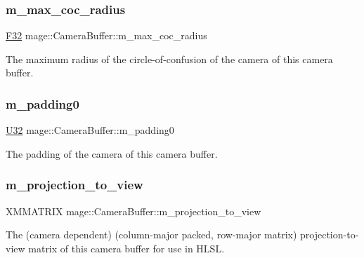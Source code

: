 \subsubsection{\texorpdfstring{m\+\_\+max\+\_\+coc\+\_\+radius}{m\_max\_coc\_radius}}
{\footnotesize\ttfamily \hyperlink{namespacemage_aa97e833b45f06d60a0a9c4fc22ae02c0}{F32} mage\+::\+Camera\+Buffer\+::m\+\_\+max\+\_\+coc\+\_\+radius}

The maximum radius of the circle-\/of-\/confusion of the camera of this camera buffer. \hypertarget{structmage_1_1_camera_buffer_a56019b41362cd7ddb5d747ed4705d854}{}\label{structmage_1_1_camera_buffer_a56019b41362cd7ddb5d747ed4705d854} 
\subsubsection{\texorpdfstring{m\+\_\+padding0}{m\_padding0}}
{\footnotesize\ttfamily \hyperlink{namespacemage_a41c104c036fba3756a74e19f793eeaa1}{U32} mage\+::\+Camera\+Buffer\+::m\+\_\+padding0}

The padding of the camera of this camera buffer. \hypertarget{structmage_1_1_camera_buffer_ad64e571c4fd9595c2fcd40bfd602e024}{}\label{structmage_1_1_camera_buffer_ad64e571c4fd9595c2fcd40bfd602e024} 
\subsubsection{\texorpdfstring{m\+\_\+projection\+\_\+to\+\_\+view}{m\_projection\_to\_view}}
{\footnotesize\ttfamily X\+M\+M\+A\+T\+R\+IX mage\+::\+Camera\+Buffer\+::m\+\_\+projection\+\_\+to\+\_\+view}

The (camera dependent) (column-\/major packed, row-\/major matrix) projection-\/to-\/view matrix of this camera buffer for use in H\+L\+SL. \hypertarget{structmage_1_1_camera_buffer_a6bbc5a57e9f456518afacf0a0e5633ed}{}\label{structmage_1_1_camera_buffer_a6bbc5a57e9f456518afacf0a0e5633ed} 
